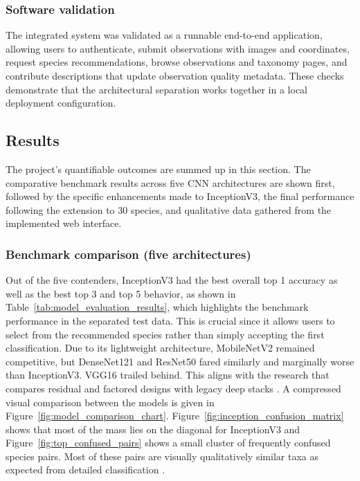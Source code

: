 \subsubsection{Software validation}

The integrated system was validated as a runnable end-to-end application, allowing users 
to authenticate, submit observations with images and coordinates, request species 
recommendations, browse observations and taxonomy pages, and contribute descriptions that update 
observation quality metadata. These checks demonstrate that the architectural separation works 
together in a local deployment configuration.

\subsection{Results}

The project's quantifiable outcomes are summed up in this section. The comparative benchmark 
results across five CNN architectures are shown first, followed by the specific enhancements 
made to InceptionV3, the final performance following the extension to 30 species, and qualitative 
data gathered from the implemented web interface.

\subsubsection{Benchmark comparison (five architectures)}

Out of the five contenders, InceptionV3 had the best overall top 1 accuracy as well as the 
best top 3 and top 5 behavior, as shown in Table~\ref{tab:model_evaluation_results}, which highlights the benchmark performance 
in the separated test data. This is crucial since it allows users to select from the recommended 
species rather than simply accepting the first classification. Due to its lightweight architecture, 
MobileNetV2 remained competitive, but DenseNet121 and ResNet50 fared similarly and marginally 
worse than InceptionV3. VGG16 trailed behind. This aligns with the research that compares 
residual and factored designs with legacy deep stacks \cite{bilgin2022bird,tang2025comparative}.
A compressed visual comparison between the models is given in Figure~\ref{fig:model_comparison_chart}. 
Figure~\ref{fig:inception_confusion_matrix} shows that most of the mass lies on the diagonal for 
InceptionV3 and Figure~\ref{fig:top_confused_pairs} shows a small cluster of frequently confused 
species pairs. Most of these pairs are visually qualitatively similar taxa as expected from 
detailed classification \cite{chen2024fetfgvc}.


